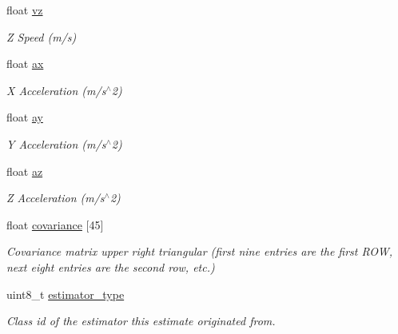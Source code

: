 \begin{DoxyCompactItemize}
float \hyperlink{struct____mavlink__local__position__ned__cov__t_a40664d8281f2884cfbfdab1ddc78df55}{vz}
\begin{DoxyCompactList}\small\item\em Z Speed (m/s) \end{DoxyCompactList}\item 
float \hyperlink{struct____mavlink__local__position__ned__cov__t_aab1f1b0cd74079fa3caab831a64c5893}{ax}
\begin{DoxyCompactList}\small\item\em X Acceleration (m/s$^\wedge$2) \end{DoxyCompactList}\item 
float \hyperlink{struct____mavlink__local__position__ned__cov__t_a379c51096d397f40d73a6f6e20ea128d}{ay}
\begin{DoxyCompactList}\small\item\em Y Acceleration (m/s$^\wedge$2) \end{DoxyCompactList}\item 
float \hyperlink{struct____mavlink__local__position__ned__cov__t_ab588035934fd835e3f4c45ed7bc67072}{az}
\begin{DoxyCompactList}\small\item\em Z Acceleration (m/s$^\wedge$2) \end{DoxyCompactList}\item 
float \hyperlink{struct____mavlink__local__position__ned__cov__t_a1a3f2cad3f1c5d6d3743df679ac58065}{covariance} \mbox{[}45\mbox{]}
\begin{DoxyCompactList}\small\item\em Covariance matrix upper right triangular (first nine entries are the first R\+O\+W, next eight entries are the second row, etc.) \end{DoxyCompactList}\item 
uint8\+\_\+t \hyperlink{struct____mavlink__local__position__ned__cov__t_a3274375eddf426c96cf6716d9080226f}{estimator\+\_\+type}
\begin{DoxyCompactList}\small\item\em Class id of the estimator this estimate originated from. \end{DoxyCompactList}\end{DoxyCompactItemize}


